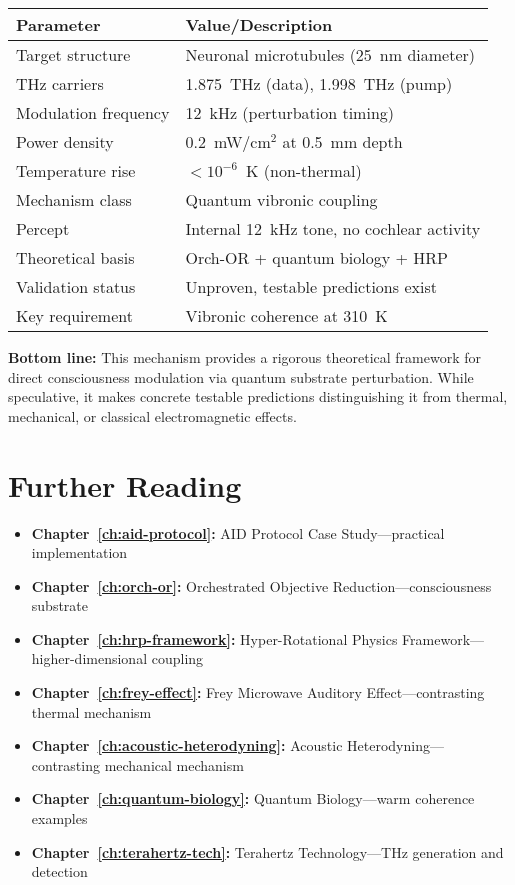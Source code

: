 \begin{center}
\small
\begin{tabular}{@{}p{}p{}@{}}
\toprule
\textbf{Parameter} & \textbf{Value/Description} \\
\midrule
Target structure & Neuronal microtubules (25~nm diameter) \\
THz carriers & 1.875~THz (data), 1.998~THz (pump) \\
Modulation frequency & 12~kHz (perturbation timing) \\
Power density & 0.2~mW/cm$^2$ at 0.5~mm depth \\
Temperature rise & $<10^{-6}$~K (non-thermal) \\
Mechanism class & Quantum vibronic coupling \\
Percept & Internal 12~kHz tone, no cochlear activity \\
Theoretical basis & Orch-OR + quantum biology + HRP \\
Validation status & Unproven, testable predictions exist \\
Key requirement & Vibronic coherence at 310~K \\
\bottomrule
\end{tabular}
\end{center}

\textbf{Bottom line:} This mechanism provides a rigorous theoretical framework for direct consciousness modulation via quantum substrate perturbation. While speculative, it makes concrete testable predictions distinguishing it from thermal, mechanical, or classical electromagnetic effects.

\section{Further Reading}

\begin{itemize}
\item \textbf{Chapter~\ref{ch:aid-protocol}:} AID Protocol Case Study---practical implementation
\item \textbf{Chapter~\ref{ch:orch-or}:} Orchestrated Objective Reduction---consciousness substrate
\item \textbf{Chapter~\ref{ch:hrp-framework}:} Hyper-Rotational Physics Framework---higher-dimensional coupling
\item \textbf{Chapter~\ref{ch:frey-effect}:} Frey Microwave Auditory Effect---contrasting thermal mechanism
\item \textbf{Chapter~\ref{ch:acoustic-heterodyning}:} Acoustic Heterodyning---contrasting mechanical mechanism
\item \textbf{Chapter~\ref{ch:quantum-biology}:} Quantum Biology---warm coherence examples
\item \textbf{Chapter~\ref{ch:terahertz-tech}:} Terahertz Technology---THz generation and detection
\end{itemize}
